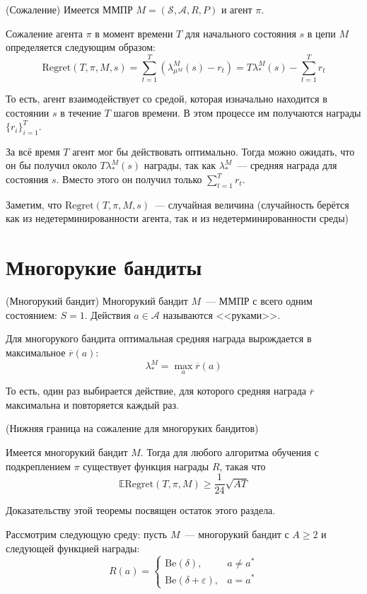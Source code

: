 \documentclass[a4paper]{article}
\newcommand{\E}{\mathbb{E}}
\newcommand{\Be}{\mbox{Be}}
\newcommand{\Reg}{\mbox{Regret}}
\newcommand{\Ss}{\mathcal{S}}
\newcommand{\A}{\mathcal{A}}
\def\eps{\varepsilon}
\begin{document}
\begin{definition}{(Сожаление)}
Имеется ММПР $M=(\Ss, \A,R,P)$ и агент $\pi$.
	
Сожаление агента $\pi$ в момент времени $T$ для начального состояния $s$ в цепи $M$ определяется следующим образом:
$$\Reg(T,\pi,M,s)=\sum\limits_{t=1}^T(\lambda^M_{\mu^M}(s)-r_t)=T\lambda_*^M(s)-\sum\limits_{t=1}^Tr_t$$

То есть, агент взаимодействует со средой, которая изначально находится в состоянии $s$ в течение $T$ шагов времени. В этом процессе им получаются награды $\{r_i\}_{i=1}^T$.

За всё время $T$ агент мог бы действовать оптимально. Тогда можно ожидать, что он бы получил около $T\lambda_*^M(s)$ награды, так как $\lambda_*^M$~--- средняя награда для состояния $s$. Вместо этого он получил только $\sum\limits_{t=1}^Tr_t$.

Заметим, что $\Reg(T,\pi,M,s)$~--- случайная величина (случайность берётся как из недетерминированности агента, так и из недетерминированности среды)
\end{definition}

\section{Многорукие бандиты}
\begin{definition}{(Многорукий бандит)}
Многорукий бандит $M$~--- ММПР с всего одним состоянием: $S=1$. Действия $a\in\A$ называются <<руками>>.

Для многорукого бандита оптимальная средняя награда вырождается в максимальное $\overline{r}(a)$:
$$\lambda_*^M=\max\limits_a\overline{r}(a)$$

То есть, один раз выбирается действие, для которого средняя награда $\overline{r}$ максимальна и повторяется каждый раз.
\end{definition}

\begin{theorem}{(Нижняя граница на сожаление для многоруких бандитов)}

Имеется многорукий бандит $M$. Тогда для любого алгоритма обучения с подкреплением $\pi$ существует функция награды $R$, такая что
$$\E\Reg(T,\pi,M)\geqslant \frac{1}{24}\sqrt{AT}$$
\end{theorem}

Доказательству этой теоремы посвящен остаток этого раздела.

Рассмотрим следующую среду: пусть $M$~--- многорукий бандит с $A\geqslant 2$ и следующей функцией награды:
$$
R(a)=\begin{cases}
\Be(\delta),&a\neq a^*\\
\Be(\delta+\eps),&a=a^*
\end{cases}
$$
\end{document}

